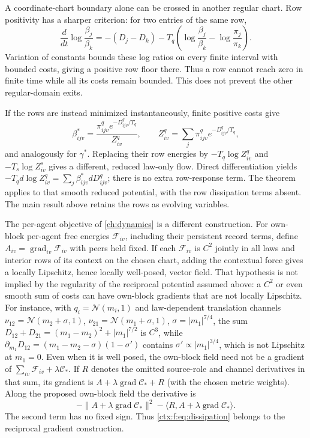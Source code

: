 A coordinate-chart boundary alone can be crossed in another regular chart. Row positivity has a sharper criterion: for two entries of the same row,
\begin{equation}
 \frac{d}{dt}\log\frac{\beta_j}{\beta_k}
 =-(D_j-D_k)-T_q\left(\log\frac{\beta_j}{\beta_k}
                           -\log\frac{\pi_j}{\pi_k}\right).
\end{equation}
Variation of constants bounds these log ratios on every finite interval with bounded costs, giving a positive row floor there. Thus a row cannot reach zero in finite time while all its costs remain bounded. This does not prevent the other regular-domain exits.

If the rows are instead minimized instantaneously, finite positive costs give
\begin{equation}
 \beta^*_{ijv}=\frac{\pi^q_{ijv}e^{-D^q_{ijv}/T_q}}{Z^q_{iv}},\qquad
 Z^q_{iv}=\sum_j\pi^q_{ijv}e^{-D^q_{ijv}/T_q},
\end{equation}
and analogously for $\gamma^*$. Replacing their row energies by $-T_q\log Z^q_{iv}$ and $-T_s\log Z^s_{iv}$ gives a different, reduced law-only flow. Direct differentiation yields $-T_qd\log Z^q_{iv}=\sum_j\beta^*_{ijv}dD^q_{ijv}$; there is no extra row-response term. The theorem applies to that smooth reduced potential, with the row dissipation terms absent. The main result above retains the rows as evolving variables.

The per-agent objective of \cref{ch:dynamics} is a different construction. For own-block per-agent free energies $\mathcal F_{iv}$, including their persistent record terms, define $A_{iv}=\operatorname{grad}_{iv}\mathcal F_{iv}$ with peers held fixed. If each $\mathcal F_{iv}$ is $C^2$ jointly in all laws and interior rows of its context on the chosen chart, adding the contextual force gives a locally Lipschitz, hence locally well-posed, vector field. That hypothesis is not implied by the regularity of the reciprocal potential assumed above: a $C^2$ or even smooth sum of costs can have own-block gradients that are not locally Lipschitz. For instance, with $q_i=\mathcal N(m_i,1)$ and law-dependent translation channels $\nu_{12}=\mathcal N(m_2+\sigma,1)$, $\nu_{21}=\mathcal N(m_1+\sigma,1)$, $\sigma=|m_1|^{7/4}$, the sum $D_{12}+D_{21}=(m_1-m_2)^2+|m_1|^{7/2}$ is $C^3$, while $\partial_{m_1}D_{12}=(m_1-m_2-\sigma)(1-\sigma')$ contains $\sigma'\propto|m_1|^{3/4}$, which is not Lipschitz at $m_1=0$. Even when it is well posed, the own-block field need not be a gradient of $\sum_{iv}\mathcal F_{iv}+\lambda\mathcal C_*$. If $R$ denotes the omitted source-role and channel derivatives in that sum, its gradient is $A+\lambda\operatorname{grad}\mathcal C_*+R$ (with the chosen metric weights). Along the proposed own-block field the derivative is
\begin{equation}
 -\|A+\lambda\operatorname{grad}\mathcal C_*\|^2
 -\langle R,A+\lambda\operatorname{grad}\mathcal C_*\rangle.
\end{equation}
The second term has no fixed sign. Thus \cref{ctx:f:eq:dissipation} belongs to the reciprocal gradient construction.

